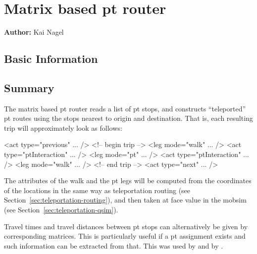 \chapter{Matrix based pt router}
\label{sec:matrix-based-pt-router}

\hfill \textbf{Author:} Kai Nagel



\section{Basic Information}

\section{Summary}
The matrix based \gls{pt} router reads a list of \gls{pt} stops, and constructs ``teleported'' \gls{pt} routes using the stops nearest to origin and destination.  That is, each resulting trip will approximately look as follows:
\begin{xml}
<act type="previous" ... />
<!-- begin trip -->
<leg mode="walk" ... />
<act type="ptInteraction" ... />
<leg mode="pt" ... />
<act type="ptInteraction" ... />
<leg mode="walk" ... />
<!-- end trip -->
<act type="next" ... />  
\end{xml}

The attributes of the walk and the \gls{pt} legs will be computed from the coordinates of the locations in the same way as teleportation routing (see Section~\ref{sec:teleportation-routing}), and then taken at face value in the \gls{mobsim} (see Section~\ref{sec:teleportation-qsim}).

Travel times and travel distances between \gls{pt} stops can alternatively be given by corresponding matrices.  This is particularly useful if a \gls{pt} assignment exists and such information can be extracted from that.  This was used by \citet{RoederNagel2013SketchPlanningBrussels} and by \citet{ZoelligRenner_PhDThesis_2014}.

